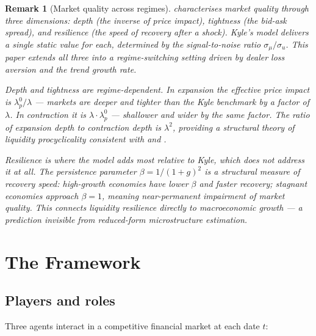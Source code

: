 \documentclass[12pt,a4paper]{article}
\newtheorem{remark}[theorem]{Remark}
\theoremstyle{definition}
\begin{document}
\begin{remark}[Market quality across regimes]
\label{rem:market_quality}
\citet{kyle1985} characterises market quality through three dimensions:
depth (the inverse of price impact), tightness (the bid-ask spread), and
resilience (the speed of recovery after a shock). Kyle's model delivers a
single static value for each, determined by the signal-to-noise ratio
$\sigma_\mu/\sigma_u$. This paper extends all three into a regime-switching
setting driven by dealer loss aversion and the trend growth rate.

Depth and tightness are regime-dependent. In expansion the effective price
impact is $\lambda^0_p/\lambda$ --- markets are deeper and tighter than
the Kyle benchmark by a factor of $\lambda$. In contraction it is
$\lambda \cdot \lambda^0_p$ --- shallower and wider by the same factor.
The ratio of expansion depth to contraction depth is $\lambda^2$,
providing a structural theory of liquidity procyclicality consistent with
\citet{adrian2010} and \citet{brunnermeier2009}.

Resilience is where the model adds most relative to Kyle, which does not
address it at all. The persistence parameter $\beta = 1/(1+g)^2$ is a
structural measure of recovery speed: high-growth economies have lower $\beta$
and faster recovery; stagnant economies approach $\beta = 1$, meaning
near-permanent impairment of market quality. This connects liquidity
resilience directly to macroeconomic growth --- a prediction invisible from
reduced-form microstructure estimation.
\end{remark}


\section{The Framework}
\label{sec:framework}

\subsection{Players and roles}
\label{sec:players}

Three agents interact in a competitive financial market at each date $t$:
\end{document}
